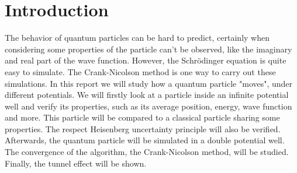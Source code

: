 \section{Introduction}

The behavior of quantum particles can be hard to predict, certainly when considering some properties of the particle can't be observed, like the imaginary and real part of the wave function. However, the Schrödinger equation is quite easy to simulate. The Crank-Nicolson method is one way to carry out these simulations. In this report we will study how a quantum particle "moves", under different potentials. We will firstly look at a particle inside an infinite potential well and verify its properties, such as its average position, energy, wave function and more. This particle will be compared to a classical particle sharing some properties. The respect Heisenberg uncertainty principle will also be verified. Afterwards, the quantum particle will be simulated in a double potential well. The convergence of the algorithm, the Crank-Nicolson method, will be studied. Finally, the tunnel effect will be shown.
